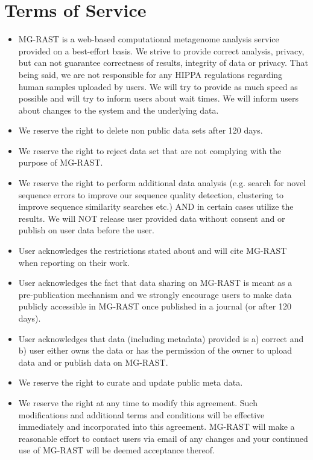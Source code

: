 \documentclass[letterpaper,10pt,english]{sphinxmanual}
\begin{document}
\chapter{Terms of Service}
\label{\detokenize{user_manual:terms-of-service}}\begin{itemize}
\item {} 
MG-RAST is a web-based computational metagenome analysis service
provided on a best-effort basis. We strive to provide correct
analysis, privacy, but can not guarantee correctness of results,
integrity of data or privacy. That being said, we are not responsible
for any HIPPA regulations regarding human samples uploaded by users.
We will try to provide as much speed as possible and will try to
inform users about wait times. We will inform users about changes to
the system and the underlying data.

\item {} 
We reserve the right to delete non public data sets after 120 days.

\item {} 
We reserve the right to reject data set that are not complying with
the purpose of MG-RAST.

\item {} 
We reserve the right to perform additional data analysis (e.g. search
for novel sequence errors to improve our sequence quality detection,
clustering to improve sequence similarity searches etc.) AND in
certain cases utilize the results. We will NOT release user provided
data without consent and or publish on user data before the user.

\item {} 
User acknowledges the restrictions stated about and will cite MG-RAST
when reporting on their work.

\item {} 
User acknowledges the fact that data sharing on MG-RAST is meant as a
pre-publication mechanism and we strongly encourage users to make
data publicly accessible in MG-RAST once published in a journal (or
after 120 days).

\item {} 
User acknowledges that data (including metadata) provided is a)
correct and b) user either owns the data or has the permission of the
owner to upload data and or publish data on MG-RAST.

\item {} 
We reserve the right to curate and update public meta data.

\item {} 
We reserve the right at any time to modify this agreement. Such
modifications and additional terms and conditions will be effective
immediately and incorporated into this agreement. MG-RAST will make a
reasonable effort to contact users via email of any changes and your
continued use of MG-RAST will be deemed acceptance thereof.

\end{itemize}
\end{document}
